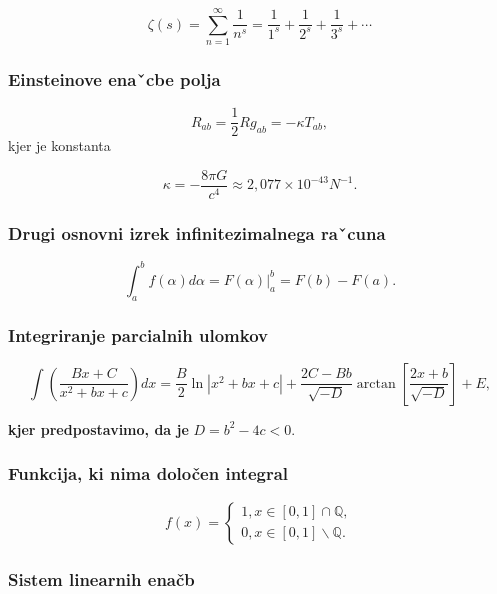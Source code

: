 \documentclass[12pt, a4paper]{article}
\newcommand{\Q}{\mathbb{Q}}
\begin{document}
\begin{equation}
\zeta (s) = \sum_{n=1}^{\infty} \frac{1}{n^s} = \frac{1}{1^s} + \frac{1}{2^s} + \frac{1}{3^s} + \cdots
\end{equation}

\subsubsection{Einsteinove enaˇcbe polja}

\begin{equation}
R_{ab} = \frac{1}{2}Rg_{ab} = -\kappa T_{ab},
\end{equation}
kjer je konstanta

\begin{equation}
\kappa = -\frac{8\pi G}{c^4} \approx 2{,}077 \times 10^{-43} N^{-1}.
\end{equation}

\subsubsection{Drugi osnovni izrek infinitezimalnega raˇcuna}

$$ \int_{a}^{b} f(\alpha)d\alpha = F(\alpha) \bigg |_{a}^{b} = F(b) - F(a). $$

\subsubsection{Integriranje parcialnih ulomkov}

\begin{equation}
\int \left(\frac{Bx+C}{x^2+bx+c}\right)dx = \frac{B}{2} \ln |x^2 + bx +c | + \frac{2C-Bb}{\sqrt{-D}} \arctan \left[ \frac{2x+b}{\sqrt{-D}} \right] + E,
\end{equation}

\textbf{kjer predpostavimo, da je} $D = b^2-4c < 0.$

\subsubsection{Funkcija, ki nima določen integral}

\begin{equation*}
f(x) = 
\begin{cases}
	1, x \in [0, 1] \cap \Q, \\
	0, x \in [0, 1] \backslash \Q .
	\end{cases}
\end{equation*}

\subsubsection{Sistem linearnih enačb}
\end{document}
